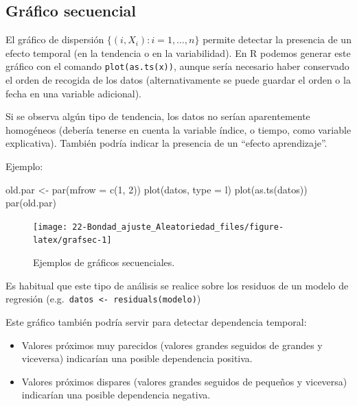 \documentclass[
  10pt,
]{book}
\newenvironment{Shaded}{\begin{snugshade}}{\end{snugshade}}
\newcommand{\AttributeTok}[1]{\textcolor[rgb]{0.77,0.63,0.00}{#1}}
\newcommand{\DecValTok}[1]{\textcolor[rgb]{0.00,0.00,0.81}{#1}}
\newcommand{\FunctionTok}[1]{\textcolor[rgb]{0.00,0.00,0.00}{#1}}
\newcommand{\NormalTok}[1]{#1}
\newcommand{\OtherTok}[1]{\textcolor[rgb]{0.56,0.35,0.01}{#1}}
\newcommand{\StringTok}[1]{\textcolor[rgb]{0.31,0.60,0.02}{#1}}
\theoremstyle{break}
\theoremstyle{nonumberplain}
\begin{document}
\hypertarget{gruxe1fico-secuencial}{%
\subsection{Gráfico secuencial}\label{gruxe1fico-secuencial}}

El gráfico de dispersión \(\{(i, X_{i}) : i = 1, \ldots, n \}\) permite detectar la presencia de un efecto temporal (en la tendencia o en la variabilidad).
En R podemos generar este gráfico con el comando \texttt{plot(as.ts(x))}, aunque sería necesario haber conservado el orden de recogida de los datos (alternativamente se puede guardar el orden o la fecha en una variable adicional).

Si se observa algún tipo de tendencia, los datos no serían aparentemente homogéneos (debería tenerse en cuenta la variable índice, o tiempo, como variable explicativa).
También podría indicar la presencia de un ``efecto aprendizaje''.

Ejemplo:

\begin{Shaded}
\begin{Highlighting}[]
\NormalTok{old.par }\OtherTok{\textless{}{-}} \FunctionTok{par}\NormalTok{(}\AttributeTok{mfrow =} \FunctionTok{c}\NormalTok{(}\DecValTok{1}\NormalTok{, }\DecValTok{2}\NormalTok{))}
\FunctionTok{plot}\NormalTok{(datos, }\AttributeTok{type =} \StringTok{\textquotesingle{}l\textquotesingle{}}\NormalTok{)}
\FunctionTok{plot}\NormalTok{(}\FunctionTok{as.ts}\NormalTok{(datos))}
\FunctionTok{par}\NormalTok{(old.par)}
\end{Highlighting}
\end{Shaded}

\begin{figure}[!htbp]

{\centering \texttt{[image: 22-Bondad\_ajuste\_Aleatoriedad\_files/figure-latex/grafsec-1]} 

}

\caption{Ejemplos de gráficos secuenciales.}\label{fig:grafsec}
\end{figure}

Es habitual que este tipo de análisis se realice sobre los residuos
de un modelo de regresión (e.g.~\texttt{datos\ \textless{}-\ residuals(modelo)})

Este gráfico también podría servir para detectar dependencia temporal:

\begin{itemize}
\item
  Valores próximos muy parecidos (valores grandes seguidos de grandes
  y viceversa) indicarían una posible dependencia positiva.
\item
  Valores próximos dispares (valores grandes seguidos de pequeños
  y viceversa) indicarían una posible dependencia negativa.
\end{itemize}
\end{document}
